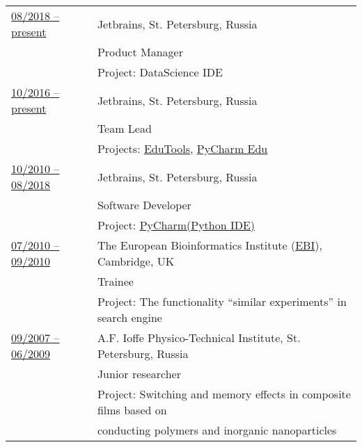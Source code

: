 \documentclass[letterpaper,11pt,oneside]{article}
\begin{document}
\noindent \begin{tabular}{@{} l l}
\underline{08/2018 -- present}    & Jetbrains, St. Petersburg, Russia \\
                          			   & Product Manager  \\
                        	 		     & Project: DataScience IDE \vspace{1em} \\

 \underline{10/2016 -- present}   &  Jetbrains, St. Petersburg, Russia  \\
                                  &  Team Lead \\
                                  &  Projects: \href{https://github.com/JetBrains/educational-plugin}{EduTools}, 
                                  \href{https://www.jetbrains.com/pycharm-edu/}{PyCharm Edu} \vspace{1em} \\

\underline{10/2010 -- 08/2018}    & Jetbrains, St. Petersburg, Russia \\
                          			   & Software Developer  \\
                        	 		     & Project: \href{https://www.jetbrains.com/pycharm/}{PyCharm(Python IDE)} \vspace{1em} \\
                        	 		     
\underline{07/2010 -- 09/2010}    & The European Bioinformatics Institute (\href{https://www.ebi.ac.uk/}{EBI}), Cambridge, UK \\
                          		  	   & Trainee \\
                    		           & Project: The functionality “similar experiments” in search engine \vspace{1em} \\

\underline{09/2007 -- 06/2009}    & A.F. Ioffe Physico-Technical Institute, St. Petersburg, Russia \\
                                  & Junior researcher \\
                          			   & Project: Switching and memory effects in composite films based on \\ 
                          			   & conducting polymers and inorganic nanoparticles \vspace{1em} \\


\end{tabular}
\end{document}
